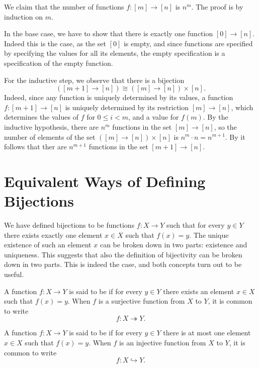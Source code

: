 \begin{example}
  We claim that the number of functions $f:[m]\to[n]$ is $n^m$. The proof is by induction on $m$. 

  In the base case, we have to show that there is exactly one function $[0]\to[n]$. Indeed this is the case, as the set $[0]$ is empty, and since functions are specified by specifying the values for all its elements, the empty specification is a specification of the empty function.

  For the inductive step, we observe that there is a bijection
  \begin{equation*}
    ([m+1]\to[n])\cong ([m]\to[n])\times [n].
  \end{equation*}
  Indeed, since any function is uniquely determined by its values, a function $f:[m+1]\to[n]$ is uniquely determined by its restriction $[m]\to[n]$, which determines the values of $f$ for $0\leq i<m$, and a value for $f(m)$. By the inductive hypothesis, there are $n^m$ functions in the set $[m]\to[n]$, so the number of elements of the set $([m]\to[n])\times[n]$ is $n^m\cdot n=n^{m+1}$. By  it follows that ther are $n^{m+1}$ functions in the set $[m+1]\to[n]$.
\end{example}

\section{Equivalent Ways of Defining Bijections}

We have defined bijections to be functions $f:X\to Y$ such that for every $y\in Y$ there exists exactly one element $x\in X$ such that $f(x)=y$. The unique existence of such an element $x$ can be broken down in two parts: existence and uniqueness. This suggests that also the definition of bijectivity can be broken down in two parts. This is indeed the case, and both concepts turn out to be useful.

\begin{definition}
  A function $f:X\to Y$ is said to be  if for every $y\in Y$ there exists an element $x\in X$ such that $f(x)=y$. When $f$ is a surjective function from $X$ to $Y$, it is common to write
  \begin{equation*}
    f:X\twoheadrightarrow Y.
  \end{equation*}

  A function $f:X\to Y$ is said to be  if for every $y\in Y$ there is at most one element $x\in X$ such that $f(x)=y$. When $f$ is an injective function from $X$ to $Y$, it is common to write
  \begin{equation*}
    f:X\hookrightarrow Y.
  \end{equation*}
\end{definition}

